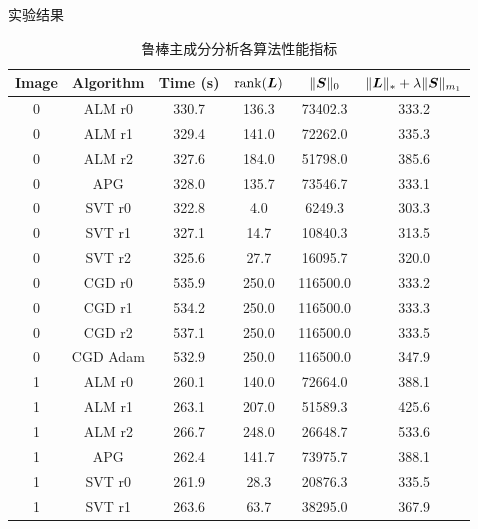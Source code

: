 \documentclass{beamer}
\begin{document}
\begin{frame}{实验结果}
  \begin{table}[H]
    \vspace*{-5.27pt}
    \centering
    \scriptsize
    \caption{鲁棒主成分分析各算法性能指标}
    \label{tab:rpca_index}
    \begin{tabular}{cccccc}
      \toprule
      Image & Algorithm      & Time (s)  & $\operatorname{rank}(\bm{L})$ & $\|\bm{S}\|_0$    & $\|\bm{L}\|_{*}+\lambda\|\bm{S}\|_{m_1}$ \\
      \midrule
      0     & ALM r0    & 330.7    & 136.3       & 73402.3     & 333.2         \\
      0     & ALM r1    & 329.4    & 141.0       & 72262.0     & 335.3         \\
      0     & ALM r2    & 327.6    & 184.0       & 51798.0     & 385.6         \\
      0     & APG       & 328.0    & 135.7       & 73546.7     & 333.1         \\
      0     & SVT r0    & 322.8    & 4.0         & 6249.3      & 303.3         \\
      0     & SVT r1    & 327.1    & 14.7        & 10840.3     & 313.5         \\
      0     & SVT r2    & 325.6    & 27.7        & 16095.7     & 320.0         \\
      0     & CGD r0    & 535.9    & 250.0       & 116500.0    & 333.2         \\
      0     & CGD r1    & 534.2    & 250.0       & 116500.0    & 333.3         \\
      0     & CGD r2    & 537.1    & 250.0       & 116500.0    & 333.5         \\
      0     & CGD Adam  & 532.9    & 250.0       & 116500.0    & 347.9         \\
      1     & ALM r0    & 260.1    & 140.0       & 72664.0     & 388.1         \\
      1     & ALM r1    & 263.1    & 207.0       & 51589.3     & 425.6         \\
      1     & ALM r2    & 266.7    & 248.0       & 26648.7     & 533.6         \\
      1     & APG       & 262.4    & 141.7       & 73975.7     & 388.1         \\
      1     & SVT r0    & 261.9    & 28.3        & 20876.3     & 335.5         \\
      1     & SVT r1    & 263.6    & 63.7        & 38295.0     & 367.9         \\
      \bottomrule
    \end{tabular}
  \end{table}
\end{frame}
\end{document}
